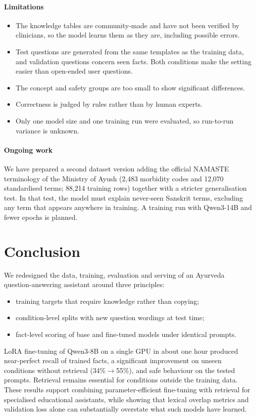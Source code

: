 \documentclass[5p,times,authoryear]{elsarticle}
\begin{document}
\paragraph{Limitations}
\begin{itemize}
\item The knowledge tables are community-made and have not been verified by clinicians, so the model learns them as they are, including possible errors.
\item Test questions are generated from the same templates as the training data, and validation questions concern seen facts. Both conditions make the setting easier than open-ended user questions.
\item The concept and safety groups are too small to show significant differences.
\item Correctness is judged by rules rather than by human experts.
\item Only one model size and one training run were evaluated, so run-to-run variance is unknown.
\end{itemize}

\paragraph{Ongoing work} We have prepared a second dataset version adding the official NAMASTE terminology of the Ministry of Ayush \citep{namaste} (2,483 morbidity codes and 12,070 standardised terms; 88,214 training rows) together with a stricter generalisation test. In that test, the model must explain never-seen Sanskrit terms, excluding any term that appears anywhere in training. A training run with Qwen3-14B and fewer epochs is planned.

\section{Conclusion}
\label{sec:conclusion}
We redesigned the data, training, evaluation and serving of an Ayurveda question-answering assistant around three principles:
\begin{itemize}
\item training targets that require knowledge rather than copying;
\item condition-level splits with new question wordings at test time;
\item fact-level scoring of base and fine-tuned models under identical prompts.
\end{itemize}
LoRA fine-tuning of Qwen3-8B on a single GPU in about one hour produced near-perfect recall of trained facts, a significant improvement on unseen conditions without retrieval (34\%$\rightarrow$55\%), and safe behaviour on the tested prompts. Retrieval remains essential for conditions outside the training data. These results support combining parameter-efficient fine-tuning with retrieval for specialised educational assistants, while showing that lexical overlap metrics and validation loss alone can substantially overstate what such models have learned.
\end{document}
